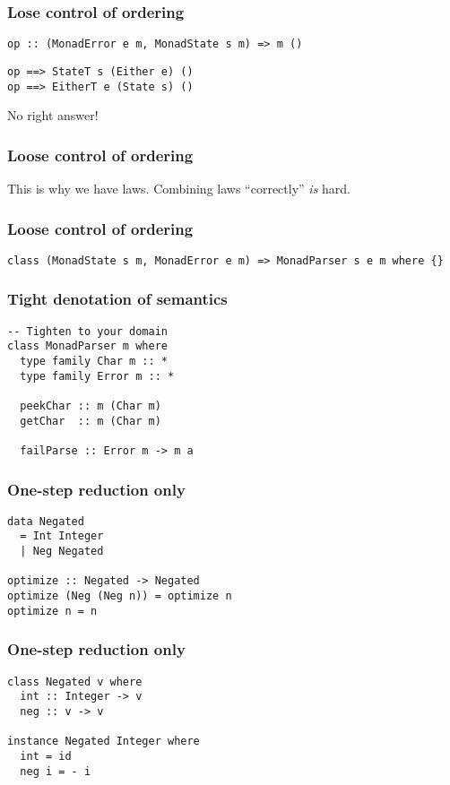 \documentclass[pdf]{beamer}
\begin{document}
\begin{frame}
  \frametitle{Lose control of ordering}
\begin{lstlisting}
op :: (MonadError e m, MonadState s m) => m ()
\end{lstlisting}
  \pause
\begin{lstlisting}
op ==> StateT s (Either e) ()
op ==> EitherT e (State s) ()
\end{lstlisting}
  \pause
No right answer!
\end{frame}

\begin{frame}
  \frametitle{Loose control of ordering}
  This is why we have laws.
  \pause
  Combining laws ``correctly'' \textit{is} hard.
\end{frame}

\begin{frame}[fragile]
  \frametitle{Loose control of ordering}
\begin{lstlisting}
class (MonadState s m, MonadError e m) => MonadParser s e m where {}
\end{lstlisting}
\end{frame}

\begin{frame}[fragile]
  \frametitle{Tight denotation of semantics}
\begin{lstlisting}
-- Tighten to your domain
class MonadParser m where
  type family Char m :: *
  type family Error m :: *

  peekChar :: m (Char m)
  getChar  :: m (Char m)
  
  failParse :: Error m -> m a
\end{lstlisting}
\end{frame}

\begin{frame}[fragile]
  \frametitle{One-step reduction only}
\begin{lstlisting}
data Negated
  = Int Integer
  | Neg Negated

optimize :: Negated -> Negated
optimize (Neg (Neg n)) = optimize n
optimize n = n
\end{lstlisting}
\end{frame}

\begin{frame}[fragile]
  \frametitle{One-step reduction only}
\begin{lstlisting}
class Negated v where
  int :: Integer -> v
  neg :: v -> v

instance Negated Integer where
  int = id
  neg i = - i
\end{lstlisting}
\end{frame}
\end{document}
